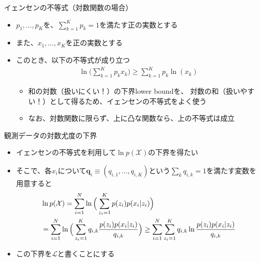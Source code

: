 \documentclass[aspectratio=169,unicode,dvipdfmx,14pt]{beamer}
\begin{document}
\begin{frame}{イェンセンの不等式（対数関数の場合）}
\begin{itemize}
\item $p_1,\ldots,p_K$を、$\sum_{k=1}^K p_k=1$を満たす正の実数とする
\item また、$x_1,\ldots, x_K$を正の実数とする
\item このとき、以下の不等式が成り立つ
\begin{align}
\ln \bigg( \sum_{k=1}^K p_k x_k \bigg) \geq \sum_{k=1}^K p_k \ln(x_k)
\end{align}
\begin{itemize}
\item 和の対数（扱いにくい！）の下界lower boundを、
対数の和（扱いやすい！）として得るため、イェンセンの不等式をよく使う
\item なお、対数関数に限らず、上に凸な関数なら、上の不等式は成立
\end{itemize}
\end{itemize}
\end{frame}

\begin{frame}{観測データの対数尤度の下界}
\begin{itemize}
\item イェンセンの不等式を利用して$\ln p(\mathcal{X})$の下界を得たい
\item そこで、各$x_i$について$\bm{q}_i \equiv (q_{i,1}, \ldots, q_{i,K})$という$\sum_k q_{i,k}=1$を満たす変数を用意すると
\begin{align}
& \ln p(\mathcal{X}) = \sum_{i=1}^N \ln \Big( \sum_{z_i=1}^K p(z_i) p(x_i | z_i) \Big)
\notag \\ & = \sum_{i=1}^N \ln \Big( \sum_{z_i=1}^K q_{i,k} \frac{p(z_i) p(x_i | z_i)}{q_{i,k}} \Big)
\geq 
\sum_{i=1}^N \sum_{z_i=1}^K q_{i,k} \ln\frac{p(z_i) p(x_i | z_i)}{q_{i,k}}
\end{align}
\vspace{-.4in}
\item この下界を$\mathcal{L}$と書くことにする
\end{itemize}
\end{frame}
\end{document}
